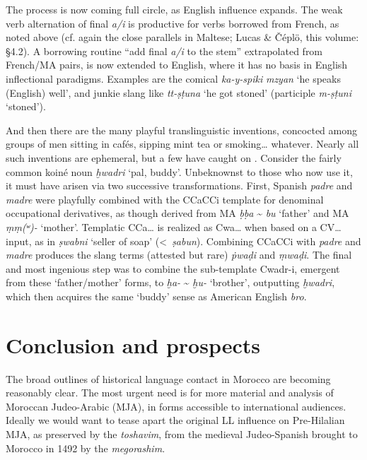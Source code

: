 \documentclass[output=paper]{langsci/langscibook}
\begin{document}
The process is now coming full circle, as English influence expands. The weak verb alternation of final \textit{a/i} is productive for verbs borrowed from French, as noted above (cf. again the close parallels in Maltese; Lucas \& Čéplö, this volume: §4.2).  A borrowing routine “add final \textit{a/i} to the stem” extrapolated from French/MA pairs, is now extended to English, where it has no basis in English inflectional paradigms. Examples are the comical \textit{ka-y-spiki} \textit{mzyan} ‘he speaks (English) well’, and junkie slang like \textit{tt-ṣṭuna} ‘he got stoned’ (participle \textit{m-ṣṭuni} ‘stoned’). 

And then there are the many playful translinguistic inventions, concocted among groups of men sitting in cafés, sipping mint tea or smoking… whatever. Nearly all such inventions are ephemeral, but a few have caught on \citep{Heath1987}. Consider the fairly common koiné noun \textit{ḫwadri} ‘pal, buddy’. Unbeknownst to those who now use it, it must have arisen via two successive transformations. First, Spanish \textit{padre} and \textit{madre} were playfully combined with the CCaCCi template for denominal occupational derivatives, as though derived from MA \textit{ḅḅa} {\textasciitilde} \textit{bu} ‘father’ and MA \textit{ṃṃ(ʷ)-} ‘mother’. Templatic CCa… is realized as Cwa… when based on a CV… input, as in \textit{ṣwabni} ‘seller of soap’ (<~\textit{ṣabun}). Combining CCaCCi with \textit{padre} and \textit{madre} produces the slang terms (attested but rare) \textit{ṗwaḍ{\R}i} and \textit{ṃwaḍ{\R}i}. The final and most ingenious step was to combine the sub-template Cwadr-i, emergent from these ‘father/mother’ forms, to \textit{ḫa-} {\textasciitilde} \textit{ḫu-} ‘brother’, outputting \textit{ḫwadri}, which then acquires the same ‘buddy’ sense as American English \textit{bro}. 

\section{Conclusion and prospects}

The broad outlines of historical language contact in Morocco are becoming reasonably clear. The most urgent need is for more material and analysis of Mor\-occan Judeo-Arabic (MJA), in forms accessible to international audiences. Ideally we would want to tease apart the original LL influence on Pre-Hilalian MJA, as preserved by the \textit{toshavim}, from the medieval Judeo-Spanish brought to Morocco in 1492 by the \textit{megorashim}. 
\end{document}

